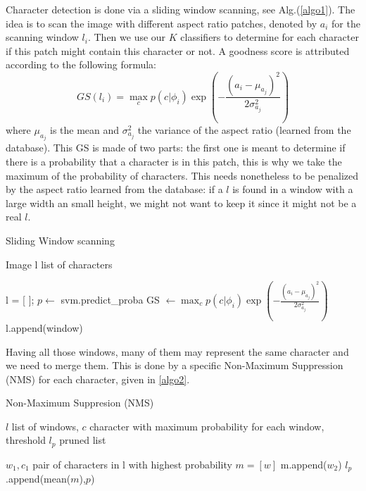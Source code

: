 \documentclass[10pt,a4paper]{article}
\begin{document}
Character detection is done via a sliding window scanning, see Alg.(\ref{algo1}). The idea is to scan the image with different aspect ratio patches, denoted by $a_i$ for the scanning window $l_i$. Then we use our $K$ classifiers to determine for each character if this patch might contain this character or not. A goodness score is attributed according to the following formula:
\begin{equation}
GS(l_i) = \max_c p(c|\phi_i) \exp\left( - \frac{(a_i - \mu_{a_j})^2}{2\sigma_{a_j}^2} \right)
\label{eq:}
\end{equation}
where $\mu_{a_j}$ is the mean and $\sigma_{a_j}^2$ the variance of the aspect ratio (learned from the database). This GS is made of two parts: the first one is meant to determine if there is a probability that a character is in this patch, this is why we take the maximum of the probability of characters. This needs nonetheless to be penalized by the aspect ratio learned from the database: if a $l$ is found in a window with a large width an small height, we might not want to keep it since it might not be a real $l$. \\

\begin{algorithm}
\caption{Sliding Window scanning}
\label{algo1}
\begin{algorithmic}
\Require Image
\Ensure l list of characters

\State l = [ ]; 
	\State $p \leftarrow$ svm.predict\_proba
	\State GS $\leftarrow \max_c p(c|\phi_i) \exp\left( - \frac{(a_i - \mu_{a_j})^2}{2\sigma_{a_j}^2} \right)$
		\State l.append(window) 
	\EndIf
\EndFor
\end{algorithmic}
\end{algorithm}

Having all those windows, many of them may represent the same character and we need to merge them. This is done by a specific Non-Maximum Suppression (NMS) for each character, given in \ref{algo2}. 
\begin{algorithm}
\caption{Non-Maximum Suppresion (NMS)}
\label{algo2}
\begin{algorithmic}
\Require $l$ list of windows, $c$ character with maximum probability for each window, threshold
\Ensure $l_p$ pruned list

	\State $w_1, c_1$ pair of characters in l with highest probability
	\State $m = [w]$
			m.append($w_2$)
		\EndIf
	\EndFor
	\State $l_p$.append(mean($m$),$p$)
\EndWhile
\end{algorithmic}
\end{algorithm}
\end{document}

